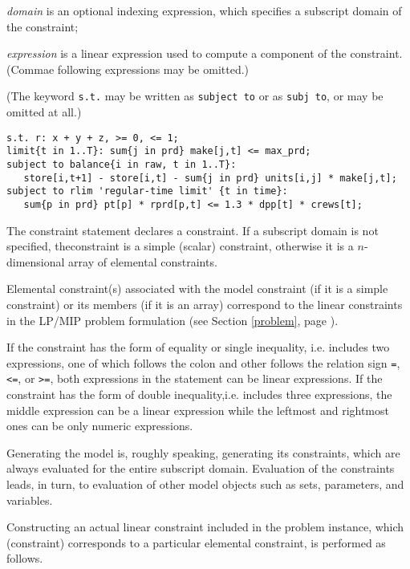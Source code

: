 \documentclass[11pt]{report}
\def\para#1{\noindent{\bf#1}}
\begin{document}
\noindent
{\it domain} is an optional indexing expression, which specifies
a subscript domain of the constraint;

\noindent
{\it expression} is a linear expression used to compute a component of
the constraint. (Commae following expressions may be omitted.)

\noindent
(The keyword {\tt s.t.} may be written as {\tt subject to} or as
{\tt subj to}, or may be omitted at all.)

\para{Examples}

\begin{verbatim}
s.t. r: x + y + z, >= 0, <= 1;
limit{t in 1..T}: sum{j in prd} make[j,t] <= max_prd;
subject to balance{i in raw, t in 1..T}:
   store[i,t+1] - store[i,t] - sum{j in prd} units[i,j] * make[j,t];
subject to rlim 'regular-time limit' {t in time}:
   sum{p in prd} pt[p] * rprd[p,t] <= 1.3 * dpp[t] * crews[t];
\end{verbatim}

The constraint statement declares a constraint. If a subscript domain
is not specified, the\linebreak constraint is a simple (scalar)
constraint, otherwise it is a $n$-dimensional array of elemental
constraints.

Elemental constraint(s) associated with the model constraint (if it is
a simple constraint) or its members (if it is an array) correspond to
the linear constraints in the LP/MIP problem formulation (see
Section \ref{problem}, page \pageref{problem}).

If the constraint has the form of equality or single inequality, i.e.
includes two expressions, one of which follows the colon and other
follows the relation sign {\tt=}, {\tt<=}, or {\tt>=}, both expressions
in the statement can be linear expressions. If the constraint has the
form of double inequality,\linebreak i.e. includes three expressions,
the middle expression can be a linear expression while the leftmost and
rightmost ones can be only numeric expressions.

Generating the model is, roughly speaking, generating its constraints,
which are always evaluated for the entire subscript domain. Evaluation
of the constraints leads, in turn, to evaluation of other model objects
such as sets, parameters, and variables.

Constructing an actual linear constraint included in the problem
instance, which (constraint) corresponds to a particular elemental
constraint, is performed as follows.
\end{document}
